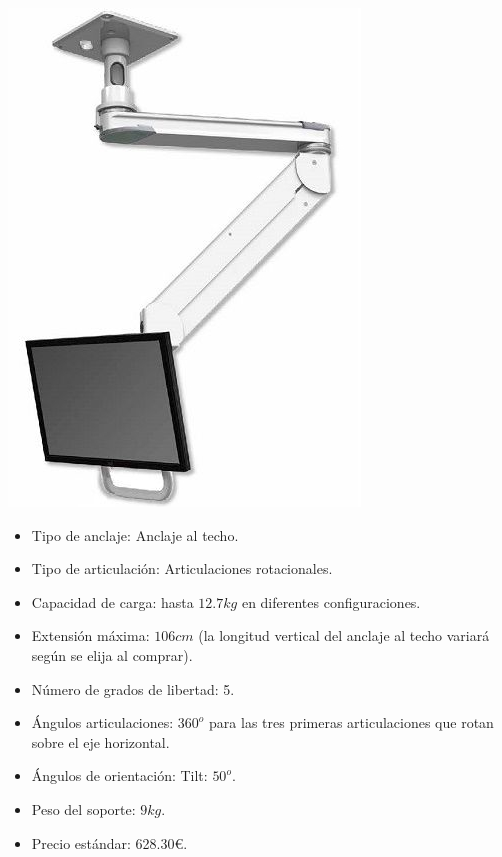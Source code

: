  \begin{minipage}{0.35\textwidth}
 	\includegraphics[width=\linewidth]{figuras/Imagenes_EstadoArte/T2EQ.jpg}
 \end{minipage}
 \begin{minipage}{0.65\textwidth}\raggedright
 	\hspace{1cm}
 	\begin{itemize}
 		\item Tipo de anclaje: Anclaje al techo.
 		\item Tipo de articulación: Articulaciones rotacionales.
 		\item Capacidad de carga: hasta $12.7kg$ en diferentes configuraciones.
 		\item Extensión máxima: $106cm$ (la longitud vertical del anclaje al techo variará según se elija al comprar).
 		\item Número de grados de libertad: 5.
 		\item Ángulos articulaciones: $360^o$ para las tres primeras articulaciones que rotan sobre el eje horizontal.
 		\item Ángulos de orientación: Tilt: $50^o$.
 		\item Peso del soporte: $9kg$.
 		\item Precio estándar: 628.30\euro.
 	\end{itemize}
 \end{minipage}
 \\

